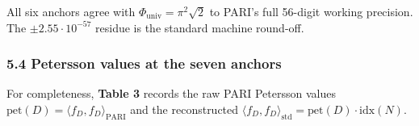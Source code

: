 \documentclass[
  11pt,
  a4paper,
]{amsart}
\begin{document}
All six anchors agree with \(\Phi_{\mathrm{univ}} = \pi^{2}\sqrt 2\) to PARI's full 56-digit working precision. The \(\pm 2.55\cdot 10^{-57}\) residue is the standard machine round-off.

\hypertarget{petersson-values-at-the-seven-anchors}{%
\subsubsection{5.4 Petersson values at the seven anchors}\label{petersson-values-at-the-seven-anchors}}

For completeness, \textbf{Table 3} records the raw PARI Petersson values \(\mathrm{pet}(D) = \langle f_D, f_D\rangle_{\mathrm{PARI}}\) and the reconstructed \(\langle f_D, f_D\rangle_{\mathrm{std}} = \mathrm{pet}(D)\cdot\mathrm{idx}(N)\).
\end{document}
